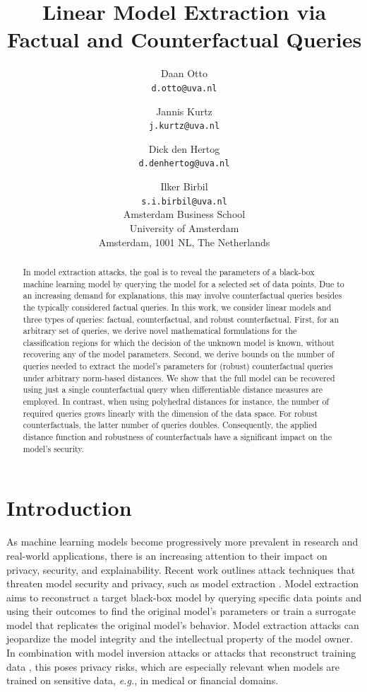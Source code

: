 \documentclass{article}
\title{Linear Model Extraction via Factual and Counterfactual Queries}
\author{
Daan Otto \\ \texttt{d.otto@uva.nl} \and
Jannis Kurtz \\ \texttt{j.kurtz@uva.nl} \and
Dick den Hertog \\ \texttt{d.denhertog@uva.nl} \and
Ilker Birbil \\ \texttt{s.i.birbil@uva.nl} \\
\vspace{0.5em}
Amsterdam Business School \\
University of Amsterdam \\
Amsterdam, 1001 NL, The Netherlands
}
\date{}
\begin{document}
\maketitle

\begin{abstract}
In model extraction attacks, the goal is to reveal the parameters of a black-box machine learning model by querying the model for a selected set of data points. Due to an increasing demand for explanations, this may involve counterfactual queries besides the typically considered factual queries. In this work, we consider linear models and three types of queries: factual, counterfactual, and robust counterfactual. First, for an arbitrary set of queries, we derive novel mathematical formulations for the classification regions for which the decision of the unknown model is known, without recovering any of the model parameters. Second, we derive bounds on the number of queries needed to extract the model's parameters for (robust) counterfactual queries under arbitrary norm-based distances. We show that the full model can be recovered using just a single counterfactual query when differentiable distance measures are employed. In contrast, when using polyhedral distances for instance, the number of required queries grows linearly with the dimension of the data space.
For robust counterfactuals, the latter number of queries doubles. Consequently, the applied distance function and robustness of counterfactuals have a significant impact on the model's security. 
\end{abstract}


\section{Introduction}
As machine learning models become progressively more prevalent in research and real-world applications, there is an increasing attention to their impact on privacy, security, and explainability. Recent work outlines attack techniques that threaten model security and privacy, such as model extraction \citep{rigaki2023survey}.
Model extraction aims to reconstruct a target black-box model by querying specific data points and using their outcomes to find the original model's parameters or train a surrogate model that replicates the original model's behavior. Model extraction attacks can jeopardize the model integrity and the intellectual property of the model owner. In combination with model inversion attacks \citep{fredrikson2015model} or attacks that reconstruct training data \citep{boenisch2023curious,ferry2024trained}, this poses privacy risks, which are especially relevant when models are trained on sensitive data, \textit{e.g.}, in medical or financial domains.
\end{document}
